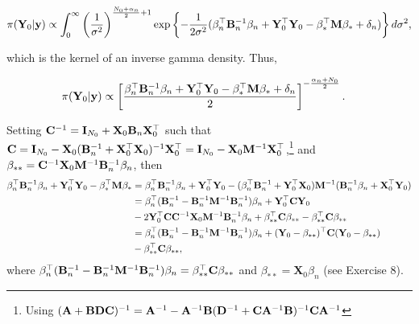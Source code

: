 \begin{align*}
	\pi({\bf{Y}}_0|{\bf{y}})&\propto\int_{0}^{\infty}\left(\frac{1}{\sigma^2}\right)^{\frac{N_0+\alpha_n}{2}+1}\exp\left\{-\frac{1}{2\sigma^2}(\beta_n^{\top}{\bf{B}}_n^{-1}\beta_n+{\bf{Y}}_0^{\top}{\bf{Y}}_0-\beta_*^{\top}{\bf{M}}\beta_*+\delta_n)\right\}d\sigma^2,\\
\end{align*}

which is the kernel of an inverse gamma density. Thus,

\begin{align*}
	\pi({\bf{Y}}_0|{\bf{y}})&\propto \left[\frac{\beta_n^{\top}{\bf{B}}_n^{-1}\beta_n+{\bf{Y}}_0^{\top}{\bf{Y}}_0-\beta_*^{\top}{\bf{M}}\beta_*+\delta_n}{2}\right]^{-\frac{\alpha_n+N_0}{2}}.
\end{align*}

Setting ${\bf{C}}^{-1}={\bf{I}}_{N_0}+{\bf{X}}_0{\bf{B}}_n{\bf{X}}_0^{\top}$ such that ${\bf{C}}={\bf{I}}_{N_0}-{\bf{X}}_0({\bf{B}}_n^{-1}+{\bf{X}}_0^{\top}{\bf{X}}_0)^{-1}{\bf{X}}_0^{\top}={\bf{I}}_{N_0}-{\bf{X}}_0{\bf{M}}^{-1}{\bf{X}}_0^{\top}$,\footnote{Using $({\bf{A}}+{\bf{B}}{\bf{D}}{\bf{C}})^{-1}={\bf{A}}^{-1}-{\bf{A}}^{-1}{\bf{B}}({\bf{D}}^{-1}+{\bf{C}}{\bf{A}}^{-1}{\bf{B}})^{-1}{\bf{C}}{\bf{A}}^{-1}$} and ${\bf{\beta}}_{**}={\bf{C}}^{-1}{\bf{X}}_0{\bf{M}}^{-1}{\bf{B}}_n^{-1}\beta_n$, then 
{\footnotesize{
\begin{align*}
	\beta_n^{\top}{\bf{B}}_n^{-1}\beta_n+{\bf{Y}}_0^{\top}{\bf{Y}}_0-\beta_*^{\top}{\bf{M}}\beta_*&=
	\beta_n^{\top}{\bf{B}}_n^{-1}\beta_n+{\bf{Y}}_0^{\top}{\bf{Y}}_0-(\beta_n^{\top}{\bf{B}}_n^{-1}+{\bf{Y}}_0^{\top}{\bf{X}}_0){\bf{M}}^{-1}({\bf{B}}_n^{-1}\beta_n+{\bf{X}}_0^{\top}{\bf{Y}}_0)\\
	&=\beta_n^{\top}({\bf{B}}_n^{-1}-{\bf{B}}_n^{-1}{\bf{M}}^{-1}{\bf{B}}_n^{-1})\beta_n+{\bf{Y}}_0^{\top}{\bf{C}}{\bf{Y}}_0\\
	&-2{\bf{Y}}_0^{\top}{\bf{C}}{\bf{C}}^{-1}{\bf{X}}_0{\bf{M}}^{-1}{\bf{B}}_n^{-1}\beta_n+{\bf{\beta}}_{**}^{\top}{\bf{C}}{\bf{\beta}}_{**}-{\bf{\beta}}_{**}^{\top}{\bf{C}}{\bf{\beta}}_{**}\\
	&=\beta_n^{\top}({\bf{B}}_n^{-1}-{\bf{B}}_n^{-1}{\bf{M}}^{-1}{\bf{B}}_n^{-1})\beta_n+({\bf{Y}}_0-{\bf{\beta}}_{**})^{\top}{\bf{C}}({\bf{Y}}_0-{\bf{\beta}}_{**})\\
	&-{\bf{\beta}}_{**}^{\top}{\bf{C}}{\bf{\beta}}_{**},
\end{align*}
}}
where $\beta_n^{\top}({\bf{B}}_n^{-1}-{\bf{B}}_n^{-1}{\bf{M}}^{-1}{\bf{B}}_n^{-1})\beta_n={\bf{\beta}}_{**}^{\top}{\bf{C}}{\bf{\beta}}_{**}$ and $\beta_{**}={\mathbf{X}}_0\beta_n$ (see Exercise 8).

